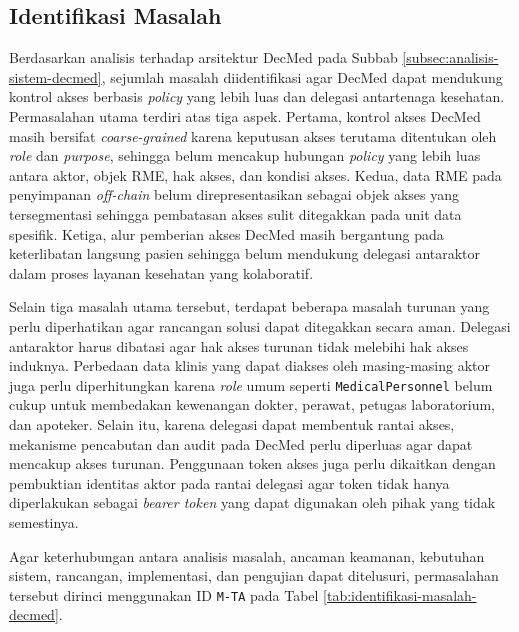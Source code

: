 \subsection{Identifikasi Masalah}
\label{subsec:identifikasi-masalah}

Berdasarkan analisis terhadap arsitektur DecMed pada Subbab \ref{subsec:analisis-sistem-decmed}, sejumlah masalah diidentifikasi agar DecMed dapat mendukung kontrol akses berbasis \textit{policy} yang lebih luas dan delegasi antartenaga kesehatan. Permasalahan utama terdiri atas tiga aspek. Pertama, kontrol akses DecMed masih bersifat \textit{coarse-grained} karena keputusan akses terutama ditentukan oleh \textit{role} dan \textit{purpose}, sehingga belum mencakup hubungan \textit{policy} yang lebih luas antara aktor, objek RME, hak akses, dan kondisi akses. Kedua, data RME pada penyimpanan \textit{off-chain} belum direpresentasikan sebagai objek akses yang tersegmentasi sehingga pembatasan akses sulit ditegakkan pada unit data spesifik. Ketiga, alur pemberian akses DecMed masih bergantung pada keterlibatan langsung pasien sehingga belum mendukung delegasi antaraktor dalam proses layanan kesehatan yang kolaboratif.

Selain tiga masalah utama tersebut, terdapat beberapa masalah turunan yang perlu diperhatikan agar rancangan solusi dapat ditegakkan secara aman. Delegasi antaraktor harus dibatasi agar hak akses turunan tidak melebihi hak akses induknya. Perbedaan data klinis yang dapat diakses oleh masing-masing aktor juga perlu diperhitungkan karena \textit{role} umum seperti \texttt{MedicalPersonnel} belum cukup untuk membedakan kewenangan dokter, perawat, petugas laboratorium, dan apoteker. Selain itu, karena delegasi dapat membentuk rantai akses, mekanisme pencabutan dan audit pada DecMed perlu diperluas agar dapat mencakup akses turunan. Penggunaan token akses juga perlu dikaitkan dengan pembuktian identitas aktor pada rantai delegasi agar token tidak hanya diperlakukan sebagai \textit{bearer token} yang dapat digunakan oleh pihak yang tidak semestinya.

Agar keterhubungan antara analisis masalah, ancaman keamanan, kebutuhan sistem, rancangan, implementasi, dan pengujian dapat ditelusuri, permasalahan tersebut dirinci menggunakan ID \texttt{M-TA} pada Tabel \ref{tab:identifikasi-masalah-decmed}.

